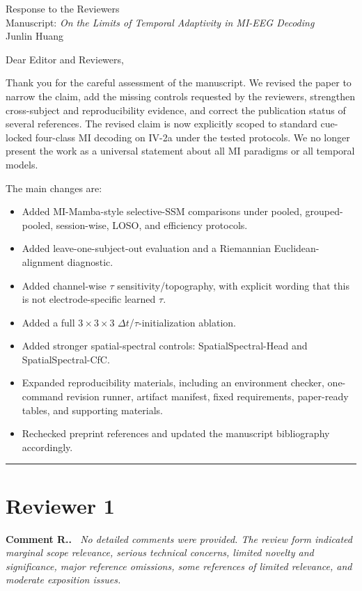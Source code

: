 \documentclass[11pt]{article}
\newcounter{reviewer}
\newcounter{point}[reviewer]
\renewcommand{\thepoint}{\thereviewer.\arabic{point}}
\newcommand{\reviewersection}[1]{%
  \stepcounter{reviewer}%
  \setcounter{point}{0}%
  \bigskip\hrule\medskip%
  \section*{Reviewer #1}%
}
\newenvironment{reviewercomment}
  {\refstepcounter{point}\medskip\noindent\textbf{Comment R\thepoint.}\itshape\ }
  {\par}
\begin{document}
\begin{center}
{\Large Response to the Reviewers}\\[0.5em]
{\large Manuscript: \emph{On the Limits of Temporal Adaptivity in MI-EEG Decoding}}\\[0.25em]
Junlin Huang
\end{center}

\noindent Dear Editor and Reviewers,

\medskip
\noindent Thank you for the careful assessment of the manuscript. We revised the paper to narrow the claim, add the missing controls requested by the reviewers, strengthen cross-subject and reproducibility evidence, and correct the publication status of several references. The revised claim is now explicitly scoped to standard cue-locked four-class MI decoding on IV-2a under the tested protocols. We no longer present the work as a universal statement about all MI paradigms or all temporal models.

\medskip
\noindent The main changes are:
\begin{itemize}[leftmargin=1.5em]
  \item Added MI-Mamba-style selective-SSM comparisons under pooled, grouped-pooled, session-wise, LOSO, and efficiency protocols.
  \item Added leave-one-subject-out evaluation and a Riemannian Euclidean-alignment diagnostic.
  \item Added channel-wise $\tau$ sensitivity/topography, with explicit wording that this is not electrode-specific learned $\tau$.
  \item Added a full $3\times3\times3$ $\Delta t$/$\tau$-initialization ablation.
  \item Added stronger spatial-spectral controls: SpatialSpectral-Head and SpatialSpectral-CfC.
  \item Expanded reproducibility materials, including an environment checker, one-command revision runner, artifact manifest, fixed requirements, paper-ready tables, and supporting materials.
  \item Rechecked preprint references and updated the manuscript bibliography accordingly.
\end{itemize}

\reviewersection{1}

\begin{reviewercomment}
No detailed comments were provided. The review form indicated marginal scope relevance, serious technical concerns, limited novelty and significance, major reference omissions, some references of limited relevance, and moderate exposition issues.
\end{reviewercomment}
\end{document}
